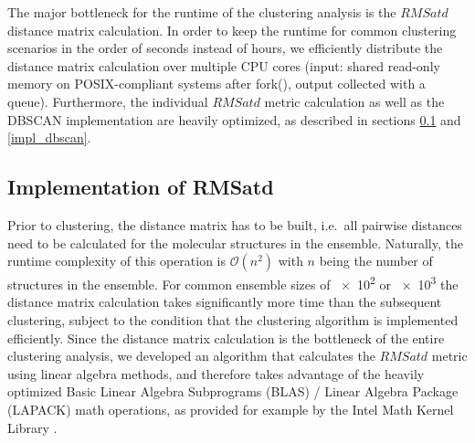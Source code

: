 The major bottleneck for the runtime of the clustering analysis is the $RMSatd$
distance matrix calculation. In order to keep the runtime for common clustering
scenarios in the order of seconds instead of hours, we efficiently distribute
the distance matrix calculation over multiple CPU cores (input: shared read-only
memory on POSIX-compliant systems after fork(), output collected with a queue).
Furthermore, the individual $RMSatd$ metric calculation as well as the DBSCAN
implementation are heavily optimized, as described in sections \ref{impl_rmsatd}
and \ref{impl_dbscan}.


\subsection{Implementation of RMSatd}
\label{impl_rmsatd}

Prior to clustering, the distance matrix has to be built, i.e.\ all pairwise
distances need to be calculated for the molecular structures in the ensemble.
Naturally, the runtime complexity of this operation is $\mathcal{O}(n^2)$ with
$n$ being the number of structures in the ensemble. For common ensemble sizes of
\num{e2} or \num{e3} the distance matrix calculation takes significantly more
time than the subsequent clustering, subject to the condition that the
clustering algorithm is implemented efficiently. Since the distance matrix
calculation is the bottleneck of the entire clustering analysis, we developed an
algorithm that calculates the $RMSatd$ metric using linear algebra methods, and
therefore takes advantage of the heavily optimized Basic Linear Algebra
Subprograms (BLAS) / Linear Algebra Package (LAPACK) math operations, as
provided for example by the Intel Math Kernel Library \cite{intel_mkl_2014}.

